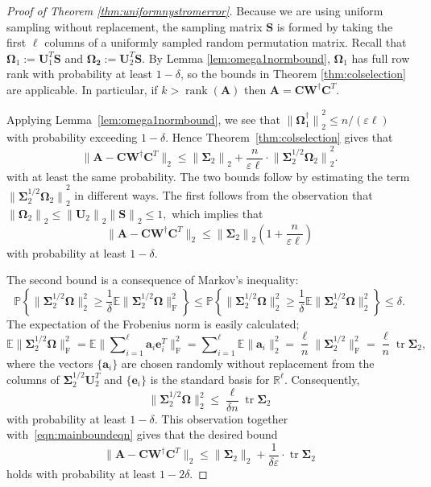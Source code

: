 \documentclass[11pt,letterpaper,twoside,reqno,nosumlimits]{amsart}
\def\pinv{\dagger}
\def\transp{T}
\newcommand{\mat}[1]{\ensuremath{\mathbf{#1}}}
\renewcommand{\vec}[1]{\ensuremath{\mathbf{#1}}}
\newcommand{\E}{\ensuremath{\mathbb{E}}}
\newcommand{\Prob}[1]{\ensuremath{\mathbb{P}\left\{#1\right\}}}
\newcommand{\R}{\ensuremath{\mathbb{R}}}
\newcommand{\norm}[1]{\ensuremath{\big\|#1\big\|}}
\newcommand{\snorm}[1]{\ensuremath{\big\|#1\big\|_2}}
\newcommand{\snorms}[1]{\ensuremath{\big\|#1\big\|_2^2}}
\newcommand{\fnorms}[1]{\ensuremath{\big\|#1\big\|_{\mathrm{F}}^2}}
\DeclareMathOperator{\tr}{tr}
\DeclareMathOperator{\rank}{rank}
\theoremstyle{remark}
\begin{document}
\begin{proof}[Proof of Theorem \ref{thm:uniformnystromerror}]
Because we are using uniform sampling without replacement, the sampling matrix $\mat{S}$ is formed by taking the first $\ell$ columns of a uniformly sampled random permutation matrix. Recall that $\mat{\Omega}_1 := \mat{U}_1^\transp \mat{S}$ and $\mat{\Omega_2} := \mat{U}_2^\transp \mat{S}.$ By Lemma \ref{lem:omega1normbound}, $\mat{\Omega}_1$ has full row rank with probability at least $1-\delta$, so the bounds in Theorem \ref{thm:colselection} are applicable. In particular, if $k > \rank(\mat{A})$ then $\mat{A} = \mat{C}\mat{W}^\pinv \mat{C}^\transp.$

Applying Lemma~\ref{lem:omega1normbound}, we see that $\norm{\mat{\Omega}_1^\pinv}_2^2 \leq n/(\varepsilon \ell)$ with probability exceeding $1-\delta.$ Hence Theorem~\ref{thm:colselection} gives that 
\begin{equation}
 \label{eqn:mainboundeqn} 
 \|\mat{A} - \mat{C} \mat{W}^\pinv \mat{C}^\transp\|_2 \leq \norm{\mat{\Sigma}_2}_2 + \frac{n}{\varepsilon \ell} \cdot \norm{\mat{\Sigma}_2^{1/2} \mat{\Omega}_2}_2^2.
\end{equation}
with at least the same probability. The two bounds follow by estimating the term $\norm{\mat{\Sigma}_2^{1/2} \mat{\Omega}_2}_2^2$ in different ways. The first follows from the observation that $\norm{\mat{\Omega}_2}_2 \leq  \norm{\mat{U}_2}_2 \norm{\mat{S}}_2 \leq 1,$ which implies that 
\[
 \|\mat{A} - \mat{C} \mat{W}^\pinv \mat{C}^\transp\|_2 \leq \norm{\mat{\Sigma}_2}_2\left(1 + \frac{n}{\varepsilon \ell}\right)
\]
with probability at least $1 - \delta.$ 

The second bound is a consequence of Markov's inequality:
\[
\Prob{\snorms{\mat{\Sigma}_2^{1/2} \mat{\Omega}} \geq \frac{1}{\delta} \E \fnorms{\mat{\Sigma}_2^{1/2} \mat{\Omega}} } \leq \Prob{\snorms{\mat{\Sigma}_2^{1/2} \mat{\Omega}} \geq \frac{1}{\delta} \E \snorms{\mat{\Sigma}_2^{1/2} \mat{\Omega}} } \leq \delta.
\]
The expectation of the Frobenius norm is easily calculated;
\[
 \E \fnorms{\mat{\Sigma}_2^{1/2} \mat{\Omega}} = \E \fnorms{\sum\nolimits_{i=1}^\ell \vec{a}_i\vec{e}_i^\transp} = \sum\nolimits_{i=1}^\ell \E \|\vec{a}_i\|_2^2 = \frac{\ell}{n} \fnorms{\mat{\Sigma}_2^{1/2}} = \frac{\ell}{n} \tr \mat{\Sigma}_2,
\]
where the vectors $\{\vec{a}_i\}$ are chosen randomly without replacement from the columns of $\mat{\Sigma}_2^{1/2} \mat{U}_2^\transp$ and $\{\vec{e}_i\}$ is the standard basis for $\R^\ell.$ Consequently,
\[
 \snorms{\mat{\Sigma}_2^{1/2} \mat{\Omega}} \leq \frac{\ell}{\delta n} \tr \mat{\Sigma}_2
\]
with probability at least $1-\delta.$ This observation together with~\eqref{eqn:mainboundeqn} gives that the desired bound
\[
 \|\mat{A} - \mat{C} \mat{W}^\pinv \mat{C}^\transp\|_2 \leq \snorm{\mat{\Sigma}_2} + \frac{ 1}{\delta \varepsilon } \cdot \tr \mat{\Sigma}_2
\]
holds with probability at least $1-2\delta.$
\end{proof}
\end{document}
